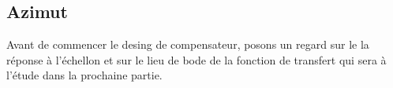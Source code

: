 \documentclass{udes_rapport} %
\begin{document}
\subsection{Azimut}
Avant de commencer le desing de compensateur, posons un regard sur le la réponse à l'échellon et sur le lieu de bode de la fonction de transfert qui sera à l'étude dans la prochaine partie.\\
\end{document}
